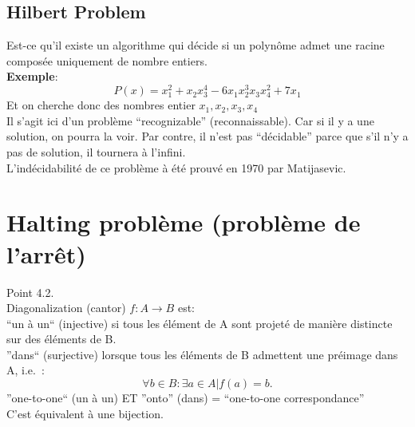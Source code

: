 \documentclass[a4paper,12pt]{article}
\begin{document}
  \subsection{Hilbert Problem}
    Est-ce qu'il existe un algorithme qui décide si un polynôme admet une racine composée uniquement de nombre entiers.\\
    \textbf{Exemple}:
    $$P(x) = x_1^2 + x_2 x_3^4 - 6 x_1 x_2^3 x_3 x_4^2 + 7 x_1$$
    Et on cherche donc des nombres entier $x_1, x_2, x_3, x_4$\\

    Il s'agit ici d'un problème ``recognizable'' (reconnaissable).  Car si il y a une solution, on pourra la voir.  Par contre, il n'est pas ``décidable'' parce que s'il n'y a pas de solution, il tournera à l'infini.\\

    L'indécidabilité de ce problème à été prouvé en 1970 par Matijasevic.

\section{Halting problème (problème de l'arrêt)}
  Point 4.2.\\
  Diagonalization (cantor)
  $f: A \rightarrow B$ est:\\
  ``un à un`` (injective) si tous les élément de A sont projeté de manière distincte sur des éléments de B.\\
  ''dans`` (surjective) lorsque tous les éléments de B admettent une préimage dans A, i.e.~:\\
  $$\forall b \in B : \exists a \in A | f(a) = b.$$
  ''one-to-one`` (un à un) ET ''onto'' (dans) = ``one-to-one correspondance''\\
  C'est équivalent à une bijection.
\end{document}
